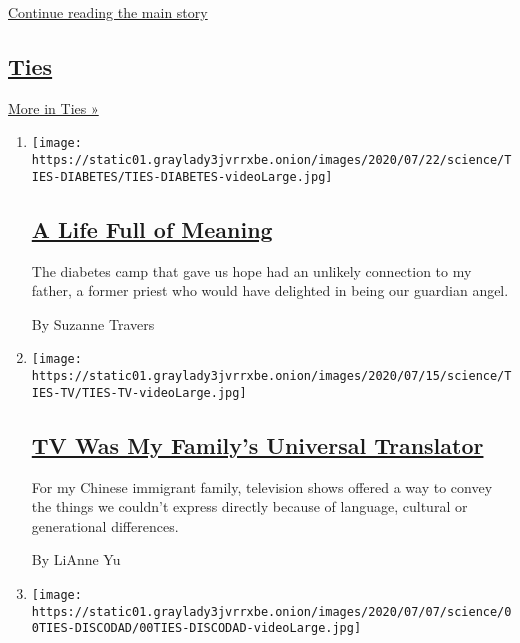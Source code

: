 \protect\hyperlink{after-mid1}{Continue reading the main story}

\hypertarget{ties-1}{%
\subsection{\texorpdfstring{\href{/column/well-ties}{Ties}}{Ties}}\label{ties-1}}

\href{/column/well-ties}{More in Ties »}

\begin{enumerate}
\def\labelenumi{\arabic{enumi}.}
\item
  \texttt{[image: https://static01.graylady3jvrrxbe.onion/images/2020/07/22/science/TIES-DIABETES/TIES-DIABETES-videoLarge.jpg]}

  \hypertarget{a-life-full-of-meaning}{%
  \subsection{\texorpdfstring{\href{/2020/07/24/well/family/a-life-full-of-meaning.html}{A
  Life Full of
  Meaning}}{A Life Full of Meaning}}\label{a-life-full-of-meaning}}

  The diabetes camp that gave us hope had an unlikely connection to my
  father, a former priest who would have delighted in being our guardian
  angel.

  By Suzanne Travers
\item
  \texttt{[image: https://static01.graylady3jvrrxbe.onion/images/2020/07/15/science/TIES-TV/TIES-TV-videoLarge.jpg]}

  \hypertarget{tv-was-my-familys-universal-translator}{%
  \subsection{\texorpdfstring{\href{/2020/07/17/well/family/tv-was-my-familys-universal-translator.html}{TV
  Was My Family's Universal
  Translator}}{TV Was My Family's Universal Translator}}\label{tv-was-my-familys-universal-translator}}

  For my Chinese immigrant family, television shows offered a way to
  convey the things we couldn't express directly because of language,
  cultural or generational differences.

  By LiAnne Yu
\item
  \texttt{[image: https://static01.graylady3jvrrxbe.onion/images/2020/07/07/science/00TIES-DISCODAD/00TIES-DISCODAD-videoLarge.jpg]}

  \hypertarget{stayin-alive-how-disco-saved-daddy}{%
}
\end{enumerate}
